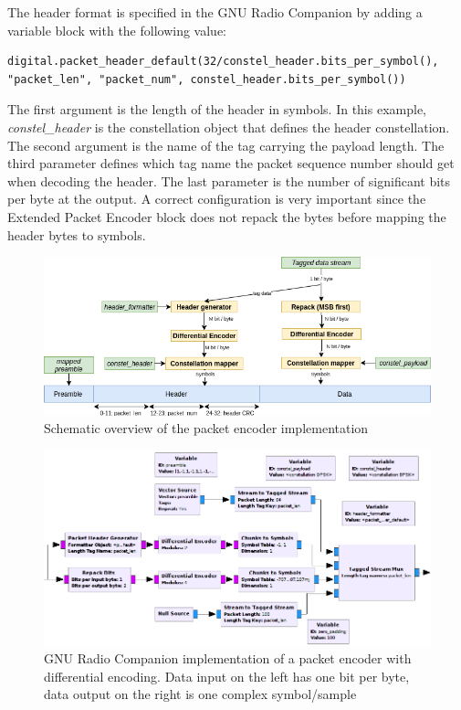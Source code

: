 The header format is specified in the GNU Radio Companion by adding a variable block with the following value:
\begin{verbatim}
digital.packet_header_default(32/constel_header.bits_per_symbol(), "packet_len", "packet_num", constel_header.bits_per_symbol())
\end{verbatim}
The first argument is the length of the header in symbols. In this example, \textit{constel\_header} is the constellation object that defines the header constellation. The  second argument is the name of the tag carrying the payload length. The third parameter defines which tag name the packet sequence number should get when decoding the header. The last parameter is the number of significant bits per byte at the output. A correct configuration is very important since the Extended Packet Encoder block does not repack the bytes before mapping the header bytes to symbols.
\begin{figure}[H]
    \centering
    \includegraphics[width=1.05\textwidth]{img_packets/packets_flowgraph_nowhitening_diff.png}
    \caption{Schematic overview of the packet encoder implementation}
    \label{fig:packets_flowgraph}
\end{figure}
\begin{figure}[H]
    \centering
    \includegraphics[width=1.05\textwidth]{img_packets/packet_enc_gr2_diff.png}
    \caption{GNU Radio Companion implementation of a packet encoder with differential encoding. Data input on the left has one bit per byte, data output on the right is one complex symbol/sample}
    \label{fig:packet_encdec}
\end{figure}




